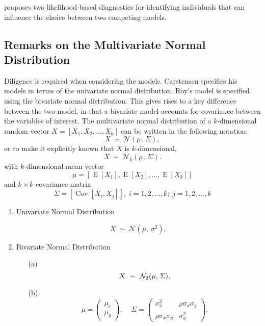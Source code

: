 \documentclass[12pt, a4paper]{report}
\theoremstyle{plain}
\theoremstyle{definition}
\theoremstyle{remark}
\begin{document}
%
%
%

\citet{Demi} proposes two likelihood-based diagnostics for identifying individuals that can influence the choice between two competing models.





\subsection{Remarks on the Multivariate Normal Distribution}

Diligence is required when considering the models. Carstensen specifies his models in terms of the univariate normal distribution. Roy's model is specified using the bivariate normal distribution.
This gives rises to a key difference between the two model, in that a bivariate model accounts for covariance between the variables of interest.
The multivariate normal distribution of a $k$-dimensional random vector $X = [X_1, X_2, \ldots, X_k]$
can be written in the following notation:
\[
X\ \sim\ \mathcal{N}(\mu,\, \Sigma),
\]
or to make it explicitly known that $X$ is $k$-dimensional,
\[
X\ \sim\ \mathcal{N}_k(\mu,\, \Sigma).
\]
with $k$-dimensional mean vector
\[ \mu = [ \operatorname{E}[X_1], \operatorname{E}[X_2], \ldots, \operatorname{E}[X_k]] \]
and $k \times k$ covariance matrix
\[ \Sigma = [\operatorname{Cov}[X_i, X_j]], \; i=1,2,\ldots,k; \; j=1,2,\ldots,k \]

\bigskip

\begin{enumerate}
	\item Univariate Normal Distribution
	
	\[
	X\ \sim\ \mathcal{N}(\mu,\, \sigma^2),
	\]
	
	\item Bivariate Normal Distribution
	
	\begin{itemize}
		\item[(a)] \[  X\ \sim\ \mathcal{N}_2(\mu,\, \Sigma), \vspace{1cm}\]
		\item[(b)] \[    \mu = \begin{pmatrix} \mu_x \\ \mu_y \end{pmatrix}, \quad
		\Sigma = \begin{pmatrix} \sigma_x^2 & \rho \sigma_x \sigma_y \\
		\rho \sigma_x \sigma_y  & \sigma_y^2 \end{pmatrix}.\]
	\end{itemize}
\end{enumerate}
\newpage
\end{document}
